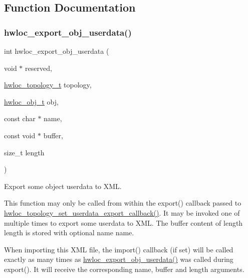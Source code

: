 \subsection{Function Documentation}
\mbox{\label{a00206_gaa541bdd628416dbbe97d0df69d3de958}} 
\subsubsection{\texorpdfstring{hwloc\+\_\+export\+\_\+obj\+\_\+userdata()}{hwloc\_export\_obj\_userdata()}}
{\footnotesize\ttfamily int hwloc\+\_\+export\+\_\+obj\+\_\+userdata (\begin{DoxyParamCaption}\item[{void $\ast$}]{reserved,  }\item[{\hyperlink{a00186_ga9d1e76ee15a7dee158b786c30b6a6e38}{hwloc\+\_\+topology\+\_\+t}}]{topology,  }\item[{\hyperlink{a00185_ga79b8ab56877ef99ac59b833203391c7d}{hwloc\+\_\+obj\+\_\+t}}]{obj,  }\item[{const char $\ast$}]{name,  }\item[{const void $\ast$}]{buffer,  }\item[{size\+\_\+t}]{length }\end{DoxyParamCaption})}



Export some object userdata to X\+ML. 

This function may only be called from within the export() callback passed to \hyperlink{a00206_ga9d6ff0f7a8dd45be9aa8575ef31978cc}{hwloc\+\_\+topology\+\_\+set\+\_\+userdata\+\_\+export\+\_\+callback()}. It may be invoked one of multiple times to export some userdata to X\+ML. The {\ttfamily buffer} content of length {\ttfamily length} is stored with optional name {\ttfamily name}.

When importing this X\+ML file, the import() callback (if set) will be called exactly as many times as \hyperlink{a00206_gaa541bdd628416dbbe97d0df69d3de958}{hwloc\+\_\+export\+\_\+obj\+\_\+userdata()} was called during export(). It will receive the corresponding {\ttfamily name}, {\ttfamily buffer} and {\ttfamily length} arguments.

